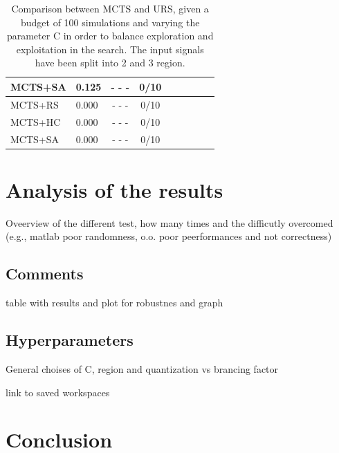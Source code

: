 \documentclass[11pt]{article}
\begin{document}
\begin{table}[ht]
\begin{tabular}{|l|l|c|c|c|c|c|c|c|}
MCTS+SA                                     & 0.125              & - - -                   & 0/10                          &           &          &          &            &              \\ \hline
MCTS+RS                                     & 0.000              & - - -                   & 0/10                          &           &          &          &            &              \\
MCTS+HC                                     & 0.000              & - - -                   & 0/10                          &           &          &          &            &              \\
MCTS+SA                                     & 0.000              & - - -                   & 0/10                          &           &          &          &            &              \\ \hline
\end{tabular}
\caption{Comparison between MCTS and URS, given a budget of 100 simulations and varying the parameter C in order to balance exploration and exploitation in the search. The input signals have been split into 2 and 3 region.}
\end{table}
\pagebreak

\section{Analysis of the results}
Oveerview of the different test, how many times and the difficutly overcomed (e.g., matlab poor randomness, o.o. poor peerformances and not correctness)

\subsection{Comments}
table with results and plot for robustnes and graph

\subsection{Hyperparameters}
General choises of C, region and quantization vs brancing factor

link to saved workspaces

\section{Conclusion}



\end{document}
